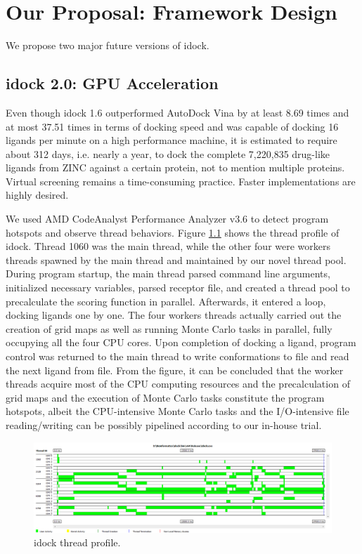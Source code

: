 \chapter{Our Proposal: Framework Design}

We propose two major future versions of idock.

\section{idock 2.0: GPU Acceleration}

Even though idock 1.6 outperformed AutoDock Vina \citep{595} by at least 8.69 times and at most 37.51 times in terms of docking speed and was capable of docking 16 ligands per minute on a high performance machine, it is estimated to require about 312 days, i.e. nearly a year, to dock the complete 7,220,835 drug-like ligands from ZINC against a certain protein, not to mention multiple proteins. Virtual screening remains a time-consuming practice. Faster implementations are highly desired.

We used AMD CodeAnalyst Performance Analyzer v3.6 to detect program hotspots and observe thread behaviors. Figure \ref{idock:ThreadProfile} shows the thread profile of idock. Thread 1060 was the main thread, while the other four were workers threads spawned by the main thread and maintained by our novel thread pool. During program startup, the main thread parsed command line arguments, initialized necessary variables, parsed receptor file, and created a thread pool to precalculate the scoring function in parallel. Afterwards, it entered a loop, docking ligands one by one. The four workers threads actually carried out the creation of grid maps as well as running Monte Carlo tasks in parallel, fully occupying all the four CPU cores. Upon completion of docking a ligand, program control was returned to the main thread to write conformations to file and read the next ligand from file. From the figure, it can be concluded that the worker threads acquire most of the CPU computing resources and the precalculation of grid maps and the execution of Monte Carlo tasks constitute the program hotspots, albeit the CPU-intensive Monte Carlo tasks and the I/O-intensive file reading/writing can be possibly pipelined according to our in-house trial.

\begin{figure}
\centering
\includegraphics[width=\textwidth]{idock/ThreadProfile.png}
\caption{idock thread profile.}
\label{idock:ThreadProfile}
\end{figure}

